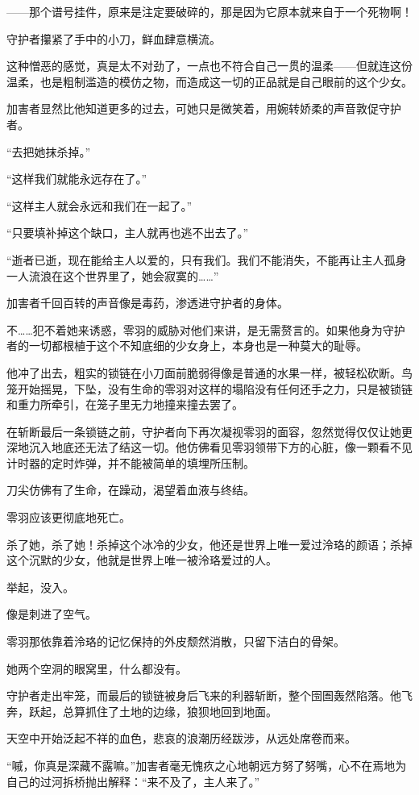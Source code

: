 \documentclass[UTF8, scheme = chinese, openany]{ctexbook}
\begin{document}
——那个谱号挂件，原来是注定要破碎的，那是因为它原本就来自于一个死物啊！

守护者攥紧了手中的小刀，鲜血肆意横流。

这种憎恶的感觉，真是太不对劲了，一点也不符合自己一贯的温柔——但就连这份温柔，也是粗制滥造的模仿之物，而造成这一切的正品就是自己眼前的这个少女。

加害者显然比他知道更多的过去，可她只是微笑着，用婉转娇柔的声音敦促守护者。

“去把她抹杀掉。”

“这样我们就能永远存在了。”

“这样主人就会永远和我们在一起了。”

“只要填补掉这个缺口，主人就再也逃不出去了。”

“逝者已逝，现在能给主人以爱的，只有我们。我们不能消失，不能再让主人孤身一人流浪在这个世界里了，她会寂寞的……”

加害者千回百转的声音像是毒药，渗透进守护者的身体。

不……犯不着她来诱惑，零羽的威胁对他们来讲，是无需赘言的。如果他身为守护者的一切都根植于这个不知底细的少女身上，本身也是一种莫大的耻辱。

他冲了出去，粗实的锁链在小刀面前脆弱得像是普通的水果一样，被轻松砍断。鸟笼开始摇晃，下坠，没有生命的零羽对这样的塌陷没有任何还手之力，只是被锁链和重力所牵引，在笼子里无力地撞来撞去罢了。

在斩断最后一条锁链之前，守护者向下再次凝视零羽的面容，忽然觉得仅仅让她更深地沉入地底还无法了结这一切。他仿佛看见零羽领带下方的心脏，像一颗看不见计时器的定时炸弹，并不能被简单的填埋所压制。

刀尖仿佛有了生命，在躁动，渴望着血液与终结。

零羽应该更彻底地死亡。

杀了她，杀了她！杀掉这个冰冷的少女，他还是世界上唯一爱过泠珞的颜语；杀掉这个沉默的少女，他就是世界上唯一被泠珞爱过的人。

举起，没入。

像是刺进了空气。

零羽那依靠着泠珞的记忆保持的外皮颓然消散，只留下洁白的骨架。

她两个空洞的眼窝里，什么都没有。

守护者走出牢笼，而最后的锁链被身后飞来的利器斩断，整个囹圄轰然陷落。他飞奔，跃起，总算抓住了土地的边缘，狼狈地回到地面。

天空中开始泛起不祥的血色，悲哀的浪潮历经跋涉，从远处席卷而来。

“嘁，你真是深藏不露嘛。”加害者毫无愧疚之心地朝远方努了努嘴，心不在焉地为自己的过河拆桥抛出解释：“来不及了，主人来了。”
\end{document}
